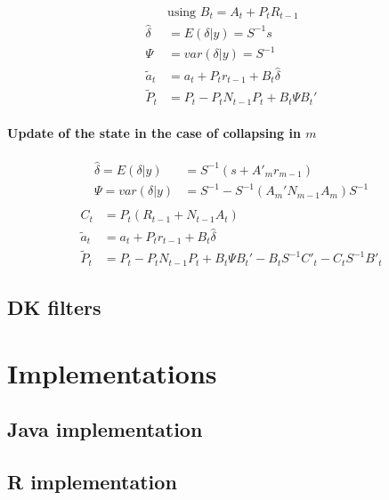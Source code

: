 \documentclass[
  letterpaper,
  DIV=11,
  numbers=noendperiod]{scrreprt}
\begin{document}
\[ 
\begin{align*}
&\text{using } B_t = A_t + P_t R_{t-1} \\
\hat \delta &= E(\delta \vert y) = S^{-1}s\\
\Psi &= var(\delta \vert y) = S^{-1} \\
\tilde a_t &= a_t + P_t r_{t-1} + B_t \hat \delta \\
\tilde P_t &= P_t - P_t N_{t-1} P_t +B_t \Psi B_t'
\end{align*}
\]

\subsection{\texorpdfstring{Update of the state in the case of
collapsing in
\(m\)}{Update of the state in the case of collapsing in m}}\label{update-of-the-state-in-the-case-of-collapsing-in-m}

\[ 
\begin{align*}
\hat \delta = E(\delta \vert y) &= S^{-1}(s + A'_m r_{m-1}) \\
\Psi = var(\delta \vert y) & = S^{-1} - S^{-1}(A_m' N_{m-1} A_m)S^{-1} \\
\end{align*}
\] \[ 
\begin{align*}
C_t &= P_t(R_{t-1} + N_{t-1} A_t) \\
\tilde a_t &= a_t + P_t r_{t-1} + B_t \hat \delta \\
\tilde P_t &= P_t - P_t N_{t-1} P_t + B_t \Psi B_t'- B_t S^{-1} C'_t - C_t S^{-1} B'_t
\end{align*}
\]

\chapter{DK filters}\label{dk-filters}

\part{Implementations}

\chapter{Java implementation}\label{java-implementation}

\chapter{R implementation}\label{r-implementation}
\end{document}
